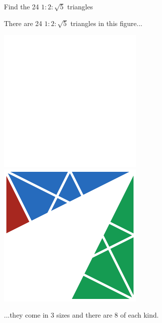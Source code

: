\documentclass[14pt]{beamer}
\begin{document}
    \begin{frame}{Find the 24 $1\!\!:\!\!2\!\!:\!\!\sqrt{5}$ triangles}
        \begin{center}
            There are 24 $1\!\!:\!\!2\!\!:\!\!\sqrt{5}$ triangles in this figure...

            \bigskip \bigskip

            \includegraphics[height=18ex]{figures/figure002b.pdf}\qquad
            \includegraphics[height=18ex]{figures/figure002d.pdf}\\

            \bigskip \bigskip

            ...they come in 3 sizes and there are 8 of each kind.
        \end{center}
    \end{frame}

\end{document}
